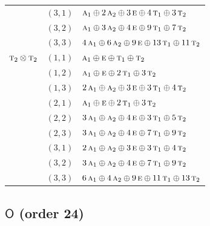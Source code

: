 \documentclass[11pt]{article}
\newcommand{\grp}[1]{\mathsf{#1}}
\newcommand{\irr}[1]{\text{\normalfont\scshape #1}}
\begin{document}
\begin{longtable}{p{} c p{}}
 & $(3,1)$ & $\irr{a}_{1}\oplus 2\,\irr{a}_{2}\oplus 3\,\irr{e}\oplus 4\,\irr{t}_{1}\oplus 3\,\irr{t}_{2}$\\

 & $(3,2)$ & $\irr{a}_{1}\oplus 3\,\irr{a}_{2}\oplus 4\,\irr{e}\oplus 9\,\irr{t}_{1}\oplus 7\,\irr{t}_{2}$\\

 & $(3,3)$ & $4\,\irr{a}_{1}\oplus 6\,\irr{a}_{2}\oplus 9\,\irr{e}\oplus 13\,\irr{t}_{1}\oplus 11\,\irr{t}_{2}$\\

\hline

$\irr{t}_{2}\otimes \irr{t}_{2}$ & $(1,1)$ & $\irr{a}_{1}\oplus \irr{e}\oplus \irr{t}_{1}\oplus \irr{t}_{2}$\\

 & $(1,2)$ & $\irr{a}_{1}\oplus \irr{e}\oplus 2\,\irr{t}_{1}\oplus 3\,\irr{t}_{2}$\\

 & $(1,3)$ & $2\,\irr{a}_{1}\oplus \irr{a}_{2}\oplus 3\,\irr{e}\oplus 3\,\irr{t}_{1}\oplus 4\,\irr{t}_{2}$\\

 & $(2,1)$ & $\irr{a}_{1}\oplus \irr{e}\oplus 2\,\irr{t}_{1}\oplus 3\,\irr{t}_{2}$\\

 & $(2,2)$ & $3\,\irr{a}_{1}\oplus \irr{a}_{2}\oplus 4\,\irr{e}\oplus 3\,\irr{t}_{1}\oplus 5\,\irr{t}_{2}$\\

 & $(2,3)$ & $3\,\irr{a}_{1}\oplus \irr{a}_{2}\oplus 4\,\irr{e}\oplus 7\,\irr{t}_{1}\oplus 9\,\irr{t}_{2}$\\

 & $(3,1)$ & $2\,\irr{a}_{1}\oplus \irr{a}_{2}\oplus 3\,\irr{e}\oplus 3\,\irr{t}_{1}\oplus 4\,\irr{t}_{2}$\\

 & $(3,2)$ & $3\,\irr{a}_{1}\oplus \irr{a}_{2}\oplus 4\,\irr{e}\oplus 7\,\irr{t}_{1}\oplus 9\,\irr{t}_{2}$\\

 & $(3,3)$ & $6\,\irr{a}_{1}\oplus 4\,\irr{a}_{2}\oplus 9\,\irr{e}\oplus 11\,\irr{t}_{1}\oplus 13\,\irr{t}_{2}$\\

\hline

\end{longtable}

\subsection*{$\grp{O}$ \quad (order 24)}
\end{document}

